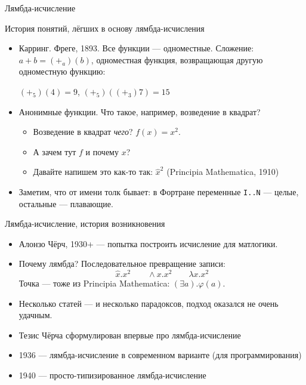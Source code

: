 \documentclass[aspectratio=169]{beamer}
\begin{document}
\newcommand\doubleplus{+\kern-1.3ex+\kern0.8ex}
\newcommand\mdoubleplus{\ensuremath{\mathbin{+\mkern-10mu+}}}

\begin{frame}{}
\begin{center}\LARGE Лямбда-исчисление \end{center}
\end{frame}

\begin{frame}[fragile]{История понятий, лёгших в основу лямбда-исчисления}
\begin{itemize}
\item Карринг. Фреге, 1893. Все функции --- одноместные. Сложение: $a+b = (+_a)(b)$, одноместная
функция, возвращающая другую одноместную функцию:

$(+_5)(4) = 9$, $(+_5)((+_3) 7) = 15$

\item Анонимные функции. Что такое, например, возведение в квадрат? 
\begin{itemize}
\item Возведение в квадрат \emph{чего}? $f(x) =x^2$. 
\item А зачем тут $f$ и почему $x$?
\item Давайте напишем это как-то так: $\hat{x}^2$ (Principia Mathematica, 1910)
\end{itemize}
\item Заметим, что от имени толк бывает: в Фортране переменные \verb!I..N! --- целые, остальные --- плавающие.
\end{itemize}
\end{frame}

\begin{frame}{Лямбда-исчисление, история возникновения}
\begin{itemize}
\item Алонзо Чёрч, 1930+ --- попытка построить исчисление для матлогики.

\item Почему лямбда? Последовательное превращение записи: $$\hat x.x^2\quad\quad\wedge x.x^2\quad\quad\lambda x.x^2$$
Точка --- тоже из Principia Mathematica: $(\exists a).\varphi(a)$.

\item Несколько статей --- и несколько парадоксов, подход оказался не очень удачным.
\item Тезис Чёрча сформулирован впервые про лямбда-исчисление
\item 1936 --- лямбда-исчисление в современном варианте (для программирования)
\item 1940 --- просто-типизированное лямбда-исчисление 
\end{itemize}
\end{frame}
\end{document}
